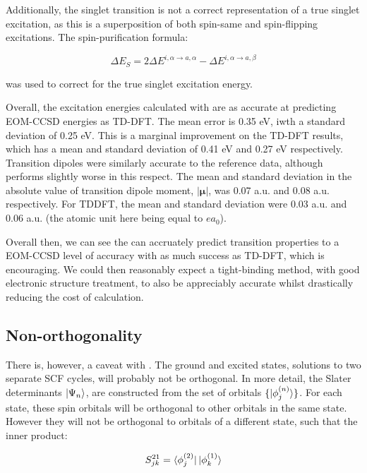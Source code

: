 Additionally, the \dscf singlet transition is not a correct representation of a 
true singlet excitation, as this is a superposition of both spin-same and spin-flipping
excitations. The spin-purification formula:

\begin{equation}
\Delta E_S = 2\Delta E^{i,\alpha \rightarrow a, \alpha} - \Delta E^{i,\alpha \rightarrow a, \beta}
\end{equation}

was used to correct for the true singlet excitation energy.

Overall, the excitation energies calculated with \dscf are as accurate at predicting
EOM-CCSD energies as TD-DFT. The mean error is 0.35 eV, iwth a standard deviation
of 0.25 eV. This is a marginal improvement on the TD-DFT results, which has a mean
and standard deviation of 0.41 eV and 0.27 eV respectively. Transition dipoles 
were similarly accurate to the reference data, although \dscf performs slightly 
worse in this respect. The mean and standard deviation in the absolute value
of transition dipole moment, $|\mathbf{\mu}|$, was 0.07 a.u. and 0.08 a.u. respectively.
For TDDFT, the mean and standard deviation were 0.03 a.u. and 0.06 a.u. (the atomic
unit here being equal to $ea_0$).

Overall then, we can see the \dscf can accruately predict transition properties
to a EOM-CCSD level of accuracy with as much success as TD-DFT, which is encouraging.
We could then reasonably expect a tight-binding method, with good electronic 
structure treatment, to also be appreciably accurate whilst drastically reducing
the cost of calculation. 

\subsection{Non-orthogonality}
\label{subsec:dscf_nonorth}
There is, however, a caveat with \dscf. The ground and excited states, solutions
to two separate SCF cycles, will probably not be orthogonal. In more detail, the
Slater determinants $\ket{\Psi_n}$, are constructed from the set of orbitals 
$\{ \ket{\phi_j^{\left(n\right)}} \}$. For each state, these spin orbitals
will be orthogonal to other orbitals in the same state. However they will not be
orthogonal to orbitals of a different state, such that the inner product:

\begin{equation}
S^{21}_{jk} = \bra{\phi_j^{\left(2\right)}} \ket{\phi_k^{\left(1\right)}}
\end{equation}

